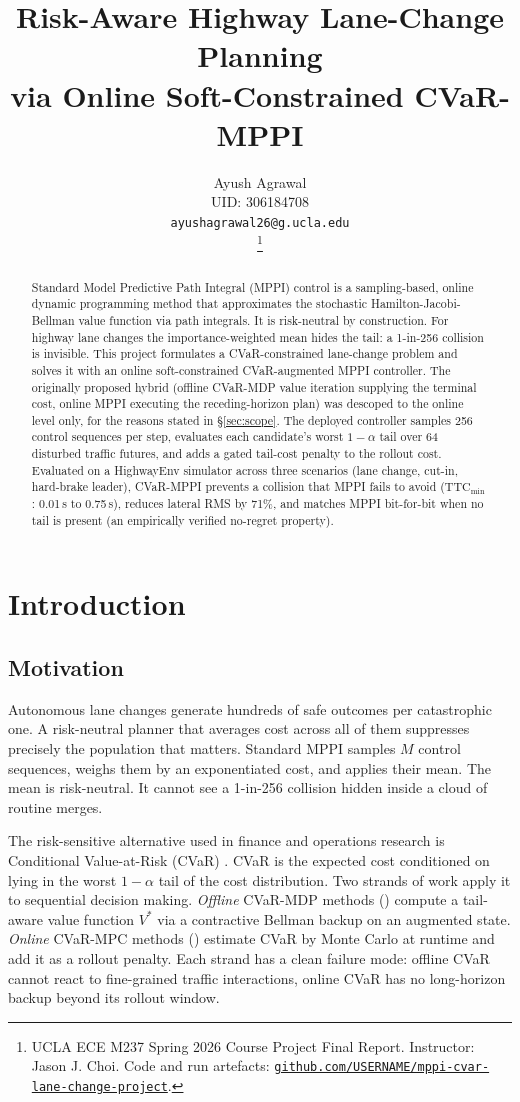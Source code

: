 \documentclass[letterpaper, 10 pt, conference]{ieeeconf}
\title{\LARGE \bf
Risk-Aware Highway Lane-Change Planning \\ via Online Soft-Constrained CVaR-MPPI}
\author{ \parbox{3 in}{\centering Ayush Agrawal \\ UID: 306184708 \\ \texttt{ayushagrawal26@g.ucla.edu}}
\thanks{UCLA ECE M237 Spring 2026 Course Project Final Report. Instructor: Jason J. Choi.
Code and run artefacts: \href{\repoBase}{\texttt{github.com/USERNAME/mppi-cvar-lane-change-project}}.}
}
\begin{document}
\maketitle

\begin{abstract}
Standard Model Predictive Path Integral (MPPI) control is a sampling-based, online dynamic programming method that approximates the stochastic Hamilton-Jacobi-Bellman value function via path integrals. It is risk-neutral by construction. For highway lane changes the importance-weighted mean hides the tail: a 1-in-256 collision is invisible. This project formulates a CVaR-constrained lane-change problem and solves it with an online soft-constrained CVaR-augmented MPPI controller. The originally proposed hybrid (offline CVaR-MDP value iteration supplying the terminal cost, online MPPI executing the receding-horizon plan) was descoped to the online level only, for the reasons stated in \S\ref{sec:scope}. The deployed controller samples 256 control sequences per step, evaluates each candidate's worst $1{-}\alpha$ tail over 64 disturbed traffic futures, and adds a gated tail-cost penalty to the rollout cost. Evaluated on a HighwayEnv simulator across three scenarios (lane change, cut-in, hard-brake leader), CVaR-MPPI prevents a collision that MPPI fails to avoid ($\mathrm{TTC}_\mathrm{min}$: 0.01\,s to 0.75\,s), reduces lateral RMS by 71\%, and matches MPPI bit-for-bit when no tail is present (an empirically verified no-regret property).
\end{abstract}

\section{Introduction}
\label{sec:intro}

\subsection{Motivation}

Autonomous lane changes generate hundreds of safe outcomes per catastrophic one. A risk-neutral planner that averages cost across all of them suppresses precisely the population that matters. Standard MPPI \cite{williams2017mppi} samples $M$ control sequences, weighs them by an exponentiated cost, and applies their mean. The mean is risk-neutral. It cannot see a 1-in-256 collision hidden inside a cloud of routine merges.

The risk-sensitive alternative used in finance and operations research is Conditional Value-at-Risk (CVaR) \cite{rockafellar2000cvar}. CVaR is the expected cost conditioned on lying in the worst $1{-}\alpha$ tail of the cost distribution. Two strands of work apply it to sequential decision making. \textit{Offline} CVaR-MDP methods (\cite{chow2014cvar, chow2015risk}) compute a tail-aware value function $V^*$ via a contractive Bellman backup on an augmented state. \textit{Online} CVaR-MPC methods (\cite{yin2022ra}) estimate CVaR by Monte Carlo at runtime and add it as a rollout penalty. Each strand has a clean failure mode: offline CVaR cannot react to fine-grained traffic interactions, online CVaR has no long-horizon backup beyond its rollout window.
\end{document}
